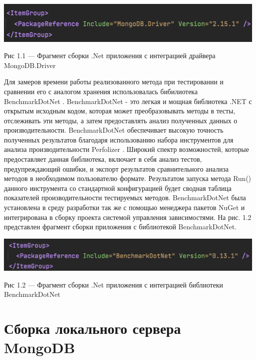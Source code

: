 \begin{center}
		\includegraphics[scale=0.6]{img/MongoDriver}
		
			Рис 1.1 — Фрагмент сборки .Net приложения с интеграцией драйвера MongoDB.Driver 
\end{center} 

Для замеров времени работы реализованного метода при тестировании и сравнении его с аналогом хранения использовалась бибилиотека BenchmarkDotNet \cite{BenchMark}. BenchmarkDotNet - это легкая и мощная библиотека .NET с открытым исходным кодом, которая может преобразовывать методы в тесты, отслеживать эти методы, а затем предоставлять анализ полученных данных о производительности. BenchmarkDotNet обеспечивает высокую точность полученных результатов благодаря использованию набора инструментов для анализа производительности Perfolizer \cite{Perfolizer}. Широкий спектр возможностей, которые предоставляет данная библиотека, включает в себя анализ тестов, предупреждающий ошибки, и экспорт результатов сравнительного анализа методов в необходимом пользователю формате. Результатом запуска метода Run() данного инструмента со стандартной конфигурацией будет сводная таблица показателей производительности тестируемых методов.
BenchmarkDotNet была установлена в среду разработки так же с помощью менеджера пакетов NuGet и интегрирована в сборку проекта системой управления зависимостями. На рис. 1.2 представлен фрагмент сборки приложения с библиотекой BenchmarkDotNet.

\begin{center}
		\includegraphics[scale=0.6]{img/BenchmarkDotNet}
		
			Рис 1.2 — Фрагмент сборки .Net приложения с интеграцией библиотеки BenchmarkDotNet 
\end{center} 

\section{Сборка локального сервера MongoDB}


